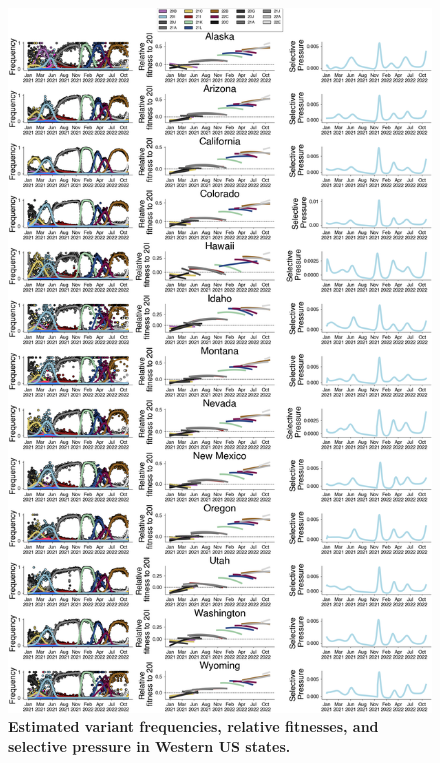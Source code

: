 \documentclass[11pt,oneside,letterpaper]{article}
\begin{document}
\begin{figure}[t!]
    \centering
    \includegraphics[width=1.0\textwidth=0.01]{./supplementary_figures/selective-pressure-analysis_West.png}
    \caption{
      \textbf{Estimated variant frequencies, relative fitnesses, and selective pressure in Western US states.}
    }
    \label{fig:selective_pressure_west}
\end{figure}
\end{document}
